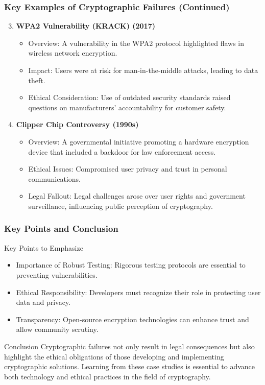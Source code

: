 \documentclass{beamer}
\begin{document}
\begin{frame}[fragile]
    \frametitle{Key Examples of Cryptographic Failures (Continued)}

    \begin{enumerate}
        \setcounter{enumi}{2}
        \item \textbf{WPA2 Vulnerability (KRACK) (2017)}
        \begin{itemize}
            \item Overview: A vulnerability in the WPA2 protocol highlighted flaws in wireless network encryption.
            \item Impact: Users were at risk for man-in-the-middle attacks, leading to data theft.
            \item Ethical Consideration: Use of outdated security standards raised questions on manufacturers' accountability for customer safety.
        \end{itemize}
        
        \item \textbf{Clipper Chip Controversy (1990s)}
        \begin{itemize}
            \item Overview: A governmental initiative promoting a hardware encryption device that included a backdoor for law enforcement access.
            \item Ethical Issues: Compromised user privacy and trust in personal communications.
            \item Legal Fallout: Legal challenges arose over user rights and government surveillance, influencing public perception of cryptography.
        \end{itemize}
    \end{enumerate}
\end{frame}

\begin{frame}[fragile]
    \frametitle{Key Points and Conclusion}

    \begin{block}{Key Points to Emphasize}
        \begin{itemize}
            \item Importance of Robust Testing: Rigorous testing protocols are essential to preventing vulnerabilities.
            \item Ethical Responsibility: Developers must recognize their role in protecting user data and privacy.
            \item Transparency: Open-source encryption technologies can enhance trust and allow community scrutiny.
        \end{itemize}
    \end{block}
    
    \begin{block}{Conclusion}
        Cryptographic failures not only result in legal consequences but also highlight the ethical obligations of those developing and implementing cryptographic solutions. Learning from these case studies is essential to advance both technology and ethical practices in the field of cryptography.
    \end{block}
\end{frame}
\end{document}
